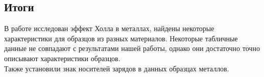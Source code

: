 \documentclass{lab}
\begin{document}
\subsection*{Итоги}

В работе исследован эффект Холла в металлах, найдены некоторые характеристики для образцов из разных
материалов. Некоторые табличные данные не совпадают с результатами нашей работы, однако они достаточно
точно описывают характеристики образцов.\\
Также установили знак носителей зарядов в данных образцах металлов.
\end{document}
